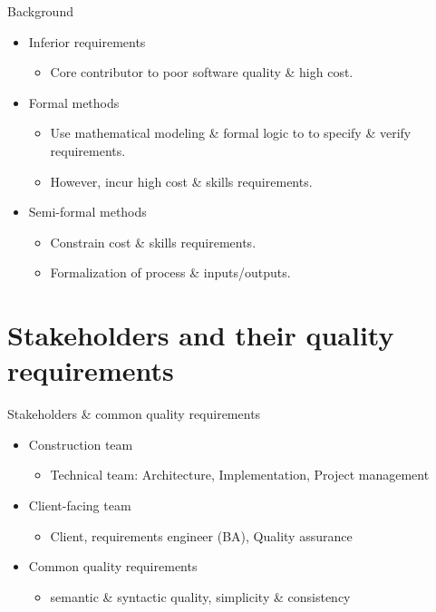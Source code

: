\documentclass[xcolor=svgnames]{beamer}
\begin{document}
\begin{frame}{Background}
  \begin{itemize} 
    \item<+-| alert@+> Inferior requirements
      \begin{itemize}
      \item Core contributor to poor software quality \& high cost.
      \end{itemize}
    \item<+-| alert@+> Formal methods
      \begin{itemize}
      \item Use mathematical modeling \& formal logic to to specify \& verify requirements.
      \item However, incur high cost \& skills requirements.
      \end{itemize}
    \item<+-| alert@+> Semi-formal methods
      \begin{itemize}
	\item Constrain cost \& skills requirements.
	\item Formalization of process \& inputs/outputs.
    
      \end{itemize}
  \end{itemize}
\end{frame}



\section{Stakeholders and their quality requirements}

\begin{frame}{Stakeholders \& common quality requirements}                      
  \begin{itemize} 
    \item<+-| alert@+> Construction team
      \begin{itemize}
	\item Technical team: Architecture, Implementation, Project management
      \end{itemize}
    \item<+-| alert@+> Client-facing team
      \begin{itemize}
	\item Client, requirements engineer (BA), Quality assurance
      \end{itemize}
    \item<+-| alert@+> Common quality requirements
      \begin{itemize}
	\item semantic \& syntactic quality, simplicity \& consistency
      \end{itemize}
  \end{itemize}
\end{frame}
\end{document}
